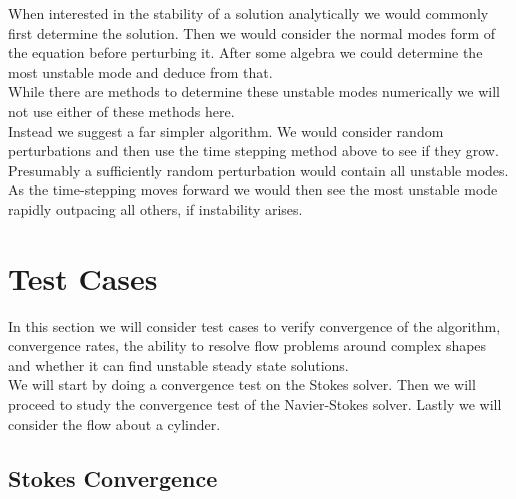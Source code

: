 \documentclass[11pt,twoside,a4paper]{article}
\begin{document}
When interested in the stability of a solution analytically we would commonly first determine the solution. Then we would consider the normal modes form of the equation before perturbing it. After some algebra we could determine the most unstable mode and deduce from that.\\
While there are methods to determine these unstable modes numerically we will not use either of these methods here.\\
Instead we suggest a far simpler algorithm.
We would consider random perturbations and then use the time stepping method above to see if they grow.\\
Presumably a sufficiently random perturbation would contain all unstable modes. As the time-stepping moves forward we would then see the most unstable mode rapidly outpacing all others, if instability arises.

\section{Test Cases}
In this section we will consider test cases to verify convergence of the algorithm, convergence rates, the ability to resolve flow problems around complex shapes and whether it can find unstable steady state solutions.\\
We will start by doing a convergence test on the Stokes solver. Then we will proceed to study the convergence test of the Navier-Stokes solver. Lastly we will consider the flow about a cylinder.
\subsection{Stokes Convergence}
\end{document}
